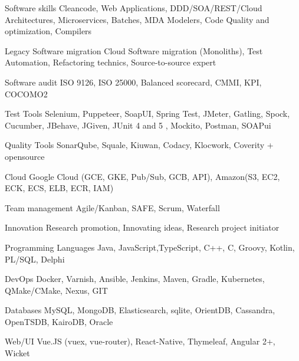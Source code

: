 

\begin{cvskills}

  \cvskill
  {Software skills} %
  {Cleancode, Web Applications, DDD/SOA/REST/Cloud Architectures, Microservices, Batches, MDA Modelers, Code Quality and optimization, Compilers} %


  \cvskill
  {Legacy Software migration} %
  {Cloud Software migration (Monoliths), Test Automation, Refactoring technics, Source-to-source expert} %


  \cvskill
  {Software audit} %
  {ISO 9126, ISO 25000, Balanced scorecard, CMMI, KPI, COCOMO2} %

  \cvskill
  {Test Tools} %
  {Selenium, Puppeteer, SoapUI, Spring Test, JMeter, Gatling, Spock, Cucumber, JBehave, JGiven, JUnit 4 and 5 , Mockito, Postman, SOAPui} %

  \cvskill
  {Quality Tools} %
  {SonarQube, Squale, Kiuwan, Codacy, Klocwork, Coverity + opensource} %


  \cvskill
  {Cloud} %
  {Google Cloud (GCE, GKE, Pub/Sub, GCB, API), Amazon(S3, EC2, ECK, ECS, ELB, ECR, IAM)} %


  \cvskill
  {Team management} %
  {Agile/Kanban, SAFE, Scrum, Waterfall} %

  \cvskill
  {Innovation} %
  {Research promotion, Innovating ideas, Research project initiator} %

  \cvskill
  {Programming Languages} %
  {Java, JavaScript,TypeScript, C++, C, Groovy, Kotlin, PL/SQL, Delphi} %
  
  \cvskill
  {DevOps} %
  {Docker, Varnish, Ansible, Jenkins, Maven, Gradle, Kubernetes, QMake/CMake, Nexus, GIT} %
  
  \cvskill
  {Databases} %
  {MySQL, MongoDB, Elasticsearch, sqlite, OrientDB, Cassandra, OpenTSDB, KairoDB, Oracle} %
  
  \cvskill
  {Web/UI} %
  {Vue.JS (vuex, vue-router), React-Native, Thymeleaf, Angular 2+, Wicket} %
  

\end{cvskills}
